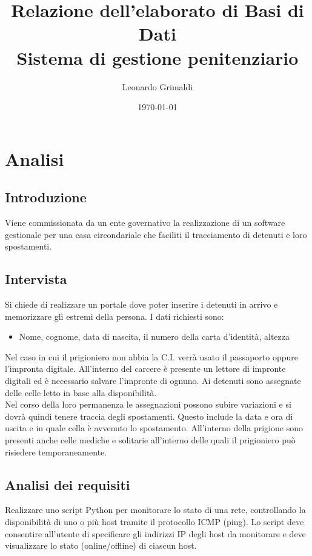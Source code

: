 \documentclass[a4paper,12pt]{report}
\title{Relazione dell'elaborato di Basi di Dati
    \\ Sistema di gestione penitenziario}
\author{Leonardo Grimaldi}
\date{\today}
\begin{document}
\maketitle
\tableofcontents
\chapter{Analisi}
\section{Introduzione}
Viene commissionata da un ente governativo la realizzazione di un software gestionale per una casa circondariale che faciliti il tracciamento di detenuti e loro spostamenti.
\section{Intervista}
Si chiede di realizzare un portale dove poter inserire i detenuti in arrivo e memorizzare gli estremi della persona.
%
I dati richiesti sono:
\begin{itemize}
    \item Nome, cognome, data di nascita, il numero della carta d'identità, altezza
\end{itemize}
Nel caso in cui il prigioniero non abbia la C.I. verrà usato il passaporto oppure l'impronta digitale.
%
All'interno del carcere è presente un lettore di impronte digitali ed è necessario salvare l'impronte di ognuno.
%
Ai detenuti sono assegnate delle celle letto in base alla disponibilità.
%
\\Nel corso della loro permanenza le assegnazioni possono subire variazioni e si dovrà quindi tenere traccia degli spostamenti.
%
Questo include la data e ora di uscita e in quale cella è avvenuto lo spostamento.
%
All'interno della prigione sono presenti anche celle mediche e solitarie all'interno delle quali il prigioniero può risiedere temporaneamente.
%



\section{Analisi dei requisiti}

Realizzare uno script Python per monitorare lo stato di una rete, controllando la disponibilità di uno o più host tramite il protocollo ICMP (ping).
%
Lo script deve consentire all'utente di specificare gli indirizzi IP degli host da monitorare e deve visualizzare lo stato (online/offline) di ciascun host.
\end{document}
